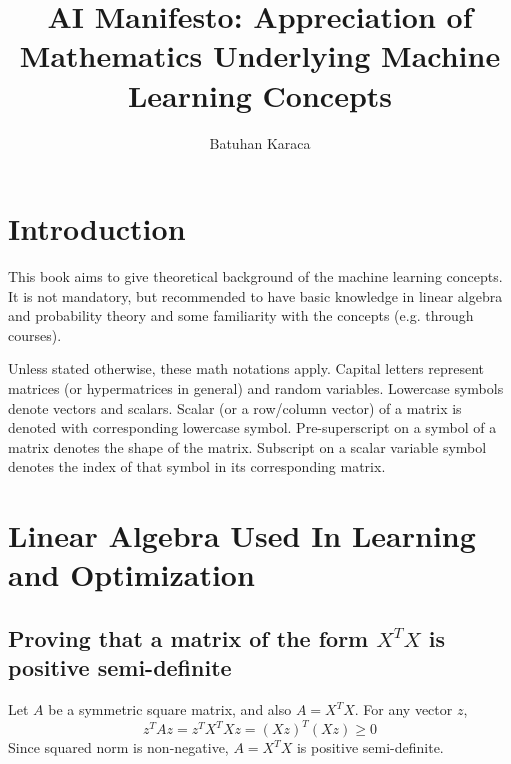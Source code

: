 \documentclass{article}
\title{AI Manifesto: Appreciation of Mathematics Underlying Machine Learning Concepts}
\author{Batuhan Karaca}
\numberwithin{equation}{subsection}
\begin{document}
\maketitle
\tableofcontents
\section{Introduction}
This book aims to give theoretical background of the machine learning concepts. It is not mandatory, but recommended to have basic knowledge in linear algebra and probability theory and some familiarity with the concepts (e.g. through courses). 

Unless stated otherwise, these math notations apply. Capital letters represent matrices (or hypermatrices in general) and random variables. Lowercase symbols denote vectors and scalars. Scalar (or a row/column vector) of a matrix is denoted with corresponding lowercase symbol. Pre-superscript on a symbol of a matrix denotes the shape of the matrix.  Subscript on a scalar variable symbol denotes the index of that symbol in its corresponding matrix.
\section{Linear Algebra Used In Learning and Optimization}
\subsection{Proving that a matrix of the form $X^TX$ is positive semi-definite}
Let $A$ be a symmetric square matrix, and also $A=X^TX$. For any vector $z$, 
\begin{equation}
z^TAz = z^TX^TXz = (Xz)^T(Xz) \geq 0
\end{equation}
Since squared norm is non-negative, $A=X^TX$ is positive semi-definite.
\end{document}
